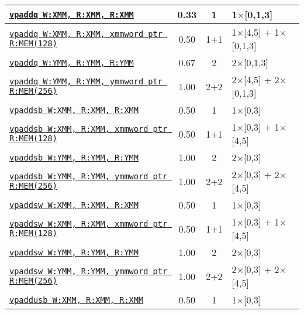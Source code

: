 \documentclass[a4paper,english,fontsize=9]{scrartcl}
\begin{document}
\begin{longtable}{p{}ccL{.25\textwidth}}
  \midrule
  \texttt{\href{https://felixcloutier.com/x86/PADDB:PADDW:PADDD:PADDQ.html}{vpaddq W:XMM, R:XMM, R:XMM}} & 0.33 & 1 & 1\(\times\)[0,1,3] \\
  \midrule
  \texttt{\href{https://felixcloutier.com/x86/PADDB:PADDW:PADDD:PADDQ.html}{vpaddq W:XMM, R:XMM, xmmword ptr R:MEM(128)}} & 0.50 & 1+1 & 1\(\times\)[4,5] + 1\(\times\)[0,1,3] \\
  \midrule
  \texttt{\href{https://felixcloutier.com/x86/PADDB:PADDW:PADDD:PADDQ.html}{vpaddq W:YMM, R:YMM, R:YMM}} & 0.67 & 2 & 2\(\times\)[0,1,3] \\
  \midrule
  \texttt{\href{https://felixcloutier.com/x86/PADDB:PADDW:PADDD:PADDQ.html}{vpaddq W:YMM, R:YMM, ymmword ptr R:MEM(256)}} & 1.00 & 2+2 & 2\(\times\)[4,5] + 2\(\times\)[0,1,3] \\
  \midrule
  \texttt{\href{https://felixcloutier.com/x86/PADDSB:PADDSW.html}{vpaddsb W:XMM, R:XMM, R:XMM}} & 0.50 & 1 & 1\(\times\)[0,3] \\
  \midrule
  \texttt{\href{https://felixcloutier.com/x86/PADDSB:PADDSW.html}{vpaddsb W:XMM, R:XMM, xmmword ptr R:MEM(128)}} & 0.50 & 1+1 & 1\(\times\)[0,3] + 1\(\times\)[4,5] \\
  \midrule
  \texttt{\href{https://felixcloutier.com/x86/PADDSB:PADDSW.html}{vpaddsb W:YMM, R:YMM, R:YMM}} & 1.00 & 2 & 2\(\times\)[0,3] \\
  \midrule
  \texttt{\href{https://felixcloutier.com/x86/PADDSB:PADDSW.html}{vpaddsb W:YMM, R:YMM, ymmword ptr R:MEM(256)}} & 1.00 & 2+2 & 2\(\times\)[0,3] + 2\(\times\)[4,5] \\
  \midrule
  \texttt{\href{https://felixcloutier.com/x86/PADDSB:PADDSW.html}{vpaddsw W:XMM, R:XMM, R:XMM}} & 0.50 & 1 & 1\(\times\)[0,3] \\
  \midrule
  \texttt{\href{https://felixcloutier.com/x86/PADDSB:PADDSW.html}{vpaddsw W:XMM, R:XMM, xmmword ptr R:MEM(128)}} & 0.50 & 1+1 & 1\(\times\)[0,3] + 1\(\times\)[4,5] \\
  \midrule
  \texttt{\href{https://felixcloutier.com/x86/PADDSB:PADDSW.html}{vpaddsw W:YMM, R:YMM, R:YMM}} & 1.00 & 2 & 2\(\times\)[0,3] \\
  \midrule
  \texttt{\href{https://felixcloutier.com/x86/PADDSB:PADDSW.html}{vpaddsw W:YMM, R:YMM, ymmword ptr R:MEM(256)}} & 1.00 & 2+2 & 2\(\times\)[0,3] + 2\(\times\)[4,5] \\
  \midrule
  \texttt{\href{https://felixcloutier.com/x86/PADDUSB:PADDUSW.html}{vpaddusb W:XMM, R:XMM, R:XMM}} & 0.50 & 1 & 1\(\times\)[0,3] \\

\end{longtable}
\end{document}

